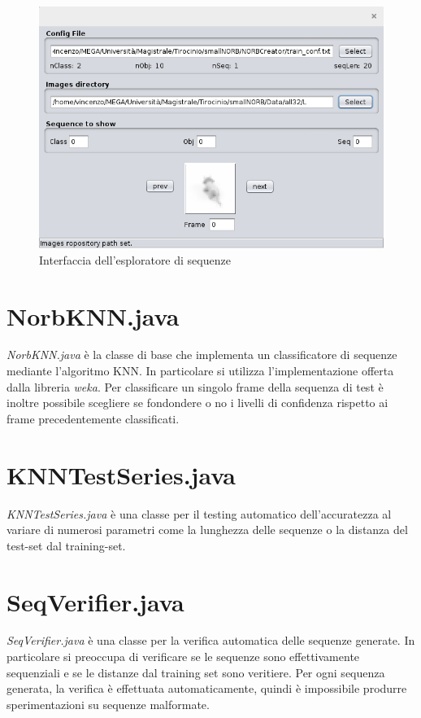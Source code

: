 \documentclass[paper=a4, fontsize=11pt]{scrartcl} %
\numberwithin{equation}{section} %
\numberwithin{figure}{section} %
\numberwithin{table}{section} %
\begin{document}
\begin{figure}[H]
  \centering
  	\label{img:seqexplorer}
    \includegraphics[width=\textwidth]{seqBrowser}
    \caption{Interfaccia dell'esploratore di sequenze}
\end{figure}

\section{NorbKNN.java}
\emph{NorbKNN.java} è la classe di base che implementa un classificatore di sequenze mediante l'algoritmo KNN. In particolare si utilizza l'implementazione offerta dalla libreria \emph{weka}. Per classificare un singolo frame della sequenza di test è inoltre possibile scegliere se fondondere o no i livelli di confidenza rispetto ai frame precedentemente classificati. 

\section{KNNTestSeries.java}
\emph{KNNTestSeries.java} è una classe per il testing automatico dell'accuratezza al variare di numerosi parametri come la lunghezza delle sequenze o la distanza del test-set dal training-set.

\section{SeqVerifier.java}
\emph{SeqVerifier.java} è una classe per la verifica automatica delle sequenze generate. In particolare si preoccupa di verificare se le sequenze sono effettivamente sequenziali e se le distanze dal training set sono veritiere. Per ogni sequenza generata, la verifica è effettuata automaticamente, quindi è impossibile produrre sperimentazioni su sequenze malformate.
\end{document}
